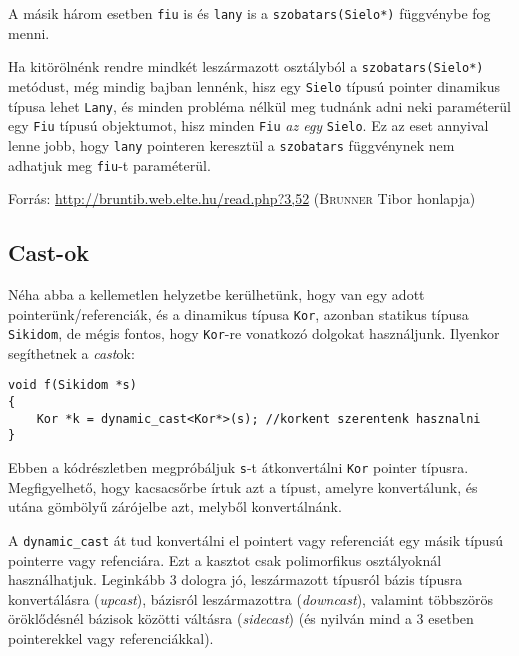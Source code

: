 \documentclass[a4paper,11.5pt]{article}
\begin{document}
	A másik három esetben \texttt{fiu} is és \texttt{lany} is a \texttt{szobatars(Sielo*)} függvénybe fog menni.
	
	\medskip
	Ha kitörölnénk rendre mindkét leszármazott osztályból a \texttt{szobatars(Sielo*)} metódust, még mindig bajban lennénk, hisz egy \texttt{Sielo} típusú pointer dinamikus típusa lehet \texttt{Lany}, és minden probléma nélkül meg tudnánk adni neki paraméterül egy \texttt{Fiu} típusú objektumot, hisz minden \texttt{Fiu} \textit{az egy} \texttt{Sielo}.  Ez az eset annyival lenne jobb, hogy \texttt{lany} pointeren keresztül a \texttt{szobatars} függvénynek nem adhatjuk meg \texttt{fiu}-t paraméterül.
	
	\medskip
	Forrás: \url{http://bruntib.web.elte.hu/read.php?3,52} (\textsc{Brunner} Tibor honlapja)
	
	\subsection{Cast-ok}
	
	Néha abba a kellemetlen helyzetbe kerülhetünk, hogy van egy adott pointerünk/referenciák, és a dinamikus típusa \texttt{Kor}, azonban statikus típusa \texttt{Sikidom}, de mégis fontos, hogy \texttt{Kor}-re vonatkozó dolgokat használjunk. Ilyenkor segíthetnek a \textit{cast}ok:
	\begin{lstlisting}
void f(Sikidom *s)
{
	Kor *k = dynamic_cast<Kor*>(s); //korkent szerentenk hasznalni
}
	\end{lstlisting}
	Ebben a kódrészletben megpróbáljuk \texttt{s}-t átkonvertálni \texttt{Kor} pointer típusra. Megfigyelhető, hogy kacsacsőrbe írtuk azt a típust, amelyre konvertálunk, és utána gömbölyű zárójelbe azt, melyből konvertálnánk.
	
	A \texttt{dynamic\_cast} át tud konvertálni el pointert vagy referenciát egy másik típusú pointerre vagy refenciára. Ezt a kasztot csak polimorfikus osztályoknál használhatjuk. Leginkább 3 dologra jó, leszármazott típusról bázis típusra konvertálásra (\textit{upcast}), bázisról leszármazottra (\textit{downcast}), valamint többszörös öröklődésnél bázisok közötti váltásra (\textit{sidecast}) (és nyilván mind a 3 esetben pointerekkel vagy referenciákkal).
	
\end{document}
